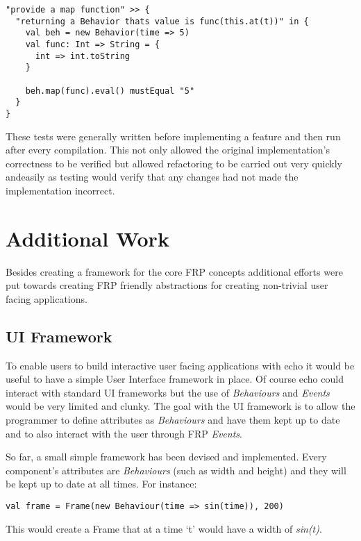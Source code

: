 \documentclass[12pt]{article}
\begin{document}
\begin{verbatim}
"provide a map function" >> {
  "returning a Behavior thats value is func(this.at(t))" in {
    val beh = new Behavior(time => 5)
    val func: Int => String = {
      int => int.toString
    }

    beh.map(func).eval() mustEqual "5"
  }
}
\end{verbatim}      

    These tests were generally written before implementing a feature and then run after every compilation. 
    This not only allowed the original implementation's correctness to be verified but
    allowed refactoring to be carried out very quickly andeasily as testing would verify that any changes had not
    made the implementation incorrect.
      
  \section{Additional Work}
    Besides creating a framework for the core FRP concepts additional efforts
    were put towards creating FRP friendly abstractions for creating non-trivial user facing
    applications.
    
    \subsection{UI Framework}
      To enable users to build interactive user facing applications with echo it would be useful to have a simple User 
      Interface framework in place. Of course echo could interact with standard UI frameworks but the use of \emph{Behaviours} 
      and \emph{Events} would be very limited and clunky. The goal with the UI framework is to allow the programmer to define 
      attributes as \emph{Behaviours} and have them kept up to date and to also interact with the user through FRP 
      \emph{Events}. 

      So far, a small simple framework has been devised and implemented. Every component's attributes are \emph{Behaviours} 
      (such as width and height) and they will be kept up to date at all times. For instance:

\begin{verbatim}
val frame = Frame(new Behaviour(time => sin(time)), 200) 
\end{verbatim}

      This would create a Frame that at a time `t' would have a width of \emph{sin(t)}.
\end{document}
